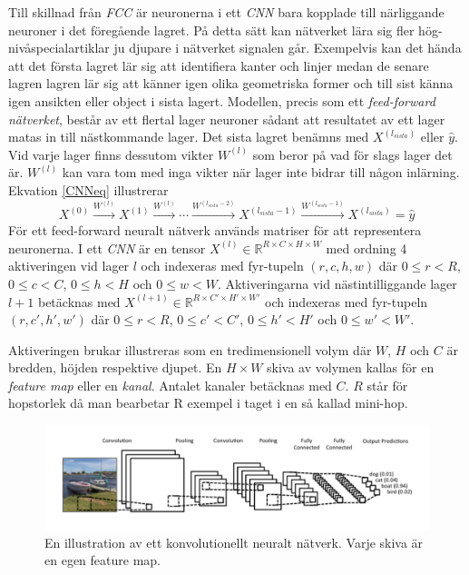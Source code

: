 \documentclass[a4paper,11pt,twoside]{article}
\begin{document}
Till skillnad från \textit{FCC} är neuronerna i ett \textit{CNN} bara kopplade till närliggande neuroner i det föregående lagret. På detta sätt kan nätverket lära sig fler hög-nivåspecialartiklar ju djupare i nätverket signalen går. Exempelvis kan det hända att det första lagret lär sig att identifiera kanter och linjer medan de senare lagren lagren lär sig att känner igen olika geometriska former och till sist känna igen ansikten eller object i sista lagert. \cite{cs231n}
\newpage
Modellen, precis som ett \textit{feed-forward nätverket}, består av ett flertal lager neuroner sådant att resultatet av ett lager matas in till nästkommande lager. Det sista lagret benämns med $X^{(l_{sista})}$ eller $\hat{y}$. Vid varje lager finns dessutom vikter $W^{(l)}$  som beror på vad för slags lager det är. $W^{(l)}$ kan vara tom med inga vikter när lager inte bidrar till någon inlärning. Ekvation \eqref{CNNeq} illustrerar \cite{cs231n} \cite{convmath}
\begin{equation}\label{CNNeq}
X^{(0)} \xrightarrow{W^{(l)}} X^{(1)}  \xrightarrow{W^{(l)}} \cdots  \xrightarrow{W^{(l_{sista}-2)}} X^{(l_{sista}-1)}  \xrightarrow{W^{(l_{sista}-1)}} X^{(l_{sista})} = \hat{y}
\end{equation}
För ett feed-forward neuralt nätverk används matriser för att representera neuronerna. I ett \textit{CNN} är en tensor $X^{(l)} \in \mathbb{R}^{R \times C  \times H \times W}$ med ordning 4 aktiveringen vid lager $l$ och indexeras med fyr-tupeln $(r,c,h,w)$ där $0 \leq r < R$, $0 \leq c < C$, $0 \leq h < H$ och $0 \leq w < W$. Aktiveringarna vid nästintilliggande lager $l+1$ betäcknas med $X^{(l+1)} \in \mathbb{R}^{R \times C' \times H' \times W'}$ och indexeras med fyr-tupeln $(r,c',h',w')$ där $0 \leq r < R$, $0 \leq c' < C'$, $0 \leq h' < H'$ och $0 \leq w' < W'$. \cite{cs231n} \cite{convmath}








Aktiveringen brukar illustreras som en tredimensionell volym där $W$, $H$ och $C$ är bredden, höjden respektive djupet. En $H \times W$ skiva av volymen kallas för en \textit{feature map} eller en \textit{kanal}. Antalet kanaler betäcknas med $C$. $R$ står för hopstorlek då man bearbetar R exempel i taget i en så kallad mini-hop. \cite{cs231n} \cite{convmath}

\begin{figure}[h]\label{figboatcnn}
	\centering
  		\includegraphics[scale=0.6]{boatcnn.png}
  	\caption{En illustration av ett konvolutionellt neuralt nätverk. Varje skiva är en egen feature map. \cite{figboatcnn}}
\end{figure}
\end{document}
